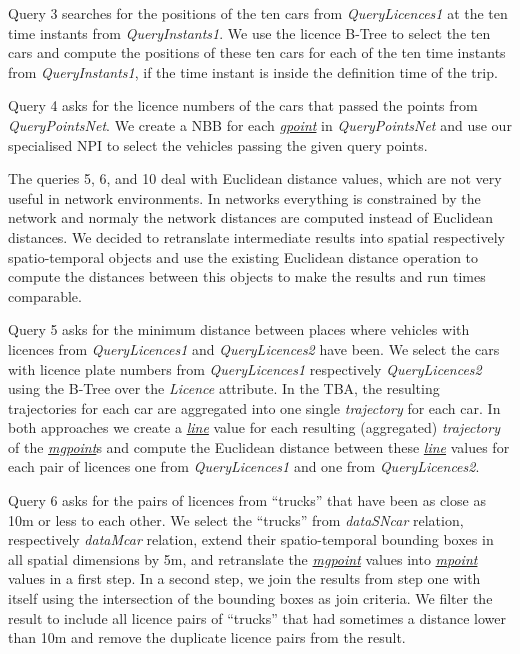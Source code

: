 \documentclass[a4paper]{article}
\newcommand{\dt}[1]{\textsl{\underline{#1}}}
\begin{document}
Query 3 searches for the positions of the ten cars from \textit{QueryLicences1} at the
ten time instants from \textit{QueryInstants1}. We use the licence B-Tree to select the
ten cars and compute the positions of these ten cars for each of the ten time
instants from \textit{QueryInstants1}, if the time instant is inside the definition
time
of the trip.

Query 4 asks for the licence numbers of the cars that passed the points
from \textit{QueryPointsNet}. We create a NBB for each \dt{gpoint} in
\textit{QueryPointsNet} and use our specialised NPI to select the vehicles passing the 
given query points.

The queries 5, 6, and 10 deal with Euclidean distance values, which are not very
useful in network environments. In networks everything is constrained by the
network and normaly the network distances are computed instead of Euclidean
distances. We decided to retranslate intermediate results
into spatial respectively spatio-temporal objects and use the existing
Euclidean distance operation to compute the distances between this objects to
make the results and run times comparable.

Query 5 asks for the minimum distance between places where vehicles with
licences from \textit{QueryLicences1} and \textit{QueryLicences2} have been. We select the cars
with licence plate numbers from \textit{QueryLicences1} respectively \textit{QueryLicences2}
using the
B-Tree over the \textit{Licence} attribute. In the TBA, the
resulting trajectories for each car are aggregated into one single \textit{trajectory}
for each car. In both approaches we create a \dt{line} value for each resulting
(aggregated) \textit{trajectory} of the \dt{mgpoint}s and compute the Euclidean
distance
between these \dt{line} values for each pair of licences one from
\textit{QueryLicences1}
and one from \textit{QueryLicences2}.

Query 6 asks for the pairs of licences from ``trucks'' that have been as close
as
10m or less to each other. We select the ``trucks'' from \textit{dataSNcar} relation,
respectively \textit{dataMcar} relation, extend their spatio-temporal
bounding boxes in all spatial dimensions by 5m, and retranslate the
\dt{mgpoint} values into \dt{mpoint} values in a first step. In a second step,
we join the results from step one with itself using the intersection of the
bounding boxes as join criteria. We filter the result to include all licence
pairs of
``trucks'' that had sometimes a distance lower than 10m and remove the duplicate
licence pairs from the result.
\end{document}
